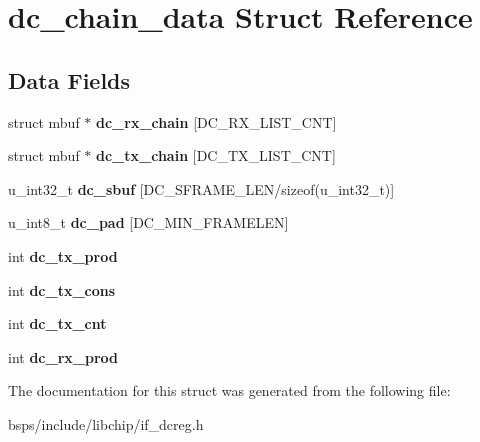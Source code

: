 \hypertarget{structdc__chain__data}{}\section{dc\+\_\+chain\+\_\+data Struct Reference}
\label{structdc__chain__data}
\subsection*{Data Fields}
\begin{DoxyCompactItemize}
\item 
\mbox{\label{structdc__chain__data_ad384a967c0f9c4d762f00ac7a6cbbffc}} 
struct mbuf $\ast$ {\bfseries dc\+\_\+rx\+\_\+chain} \mbox{[}D\+C\+\_\+\+R\+X\+\_\+\+L\+I\+S\+T\+\_\+\+C\+NT\mbox{]}
\item 
\mbox{\label{structdc__chain__data_a6d52b090c676a294e6c84b9700aae947}} 
struct mbuf $\ast$ {\bfseries dc\+\_\+tx\+\_\+chain} \mbox{[}D\+C\+\_\+\+T\+X\+\_\+\+L\+I\+S\+T\+\_\+\+C\+NT\mbox{]}
\item 
\mbox{\label{structdc__chain__data_a09a06180ef98ed1bac445336c5042c15}} 
u\+\_\+int32\+\_\+t {\bfseries dc\+\_\+sbuf} \mbox{[}D\+C\+\_\+\+S\+F\+R\+A\+M\+E\+\_\+\+L\+EN/sizeof(u\+\_\+int32\+\_\+t)\mbox{]}
\item 
\mbox{\label{structdc__chain__data_aaf26e247830dd74f5b69111dedeac419}} 
u\+\_\+int8\+\_\+t {\bfseries dc\+\_\+pad} \mbox{[}D\+C\+\_\+\+M\+I\+N\+\_\+\+F\+R\+A\+M\+E\+L\+EN\mbox{]}
\item 
\mbox{\label{structdc__chain__data_a95f11d739b0e61612b7020cae64b208b}} 
int {\bfseries dc\+\_\+tx\+\_\+prod}
\item 
\mbox{\label{structdc__chain__data_af05f260e804168a6ac37f401529e94a3}} 
int {\bfseries dc\+\_\+tx\+\_\+cons}
\item 
\mbox{\label{structdc__chain__data_ab35f557ba2381013218ca39d4d36c753}} 
int {\bfseries dc\+\_\+tx\+\_\+cnt}
\item 
\mbox{\label{structdc__chain__data_ac2d8598241d70dbc099fd87cd77eefd6}} 
int {\bfseries dc\+\_\+rx\+\_\+prod}
\end{DoxyCompactItemize}


The documentation for this struct was generated from the following file\+:\begin{DoxyCompactItemize}
\item 
bsps/include/libchip/if\+\_\+dcreg.\+h\end{DoxyCompactItemize}
